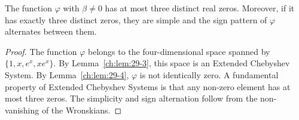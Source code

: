 \begin{lemma}
\label{ch:lem:29-5}
The function \(\varphi\) with \(\beta\neq0\) has at most three distinct real zeros. Moreover, if it has exactly three distinct zeros, they are simple and the sign pattern of \(\varphi\) alternates between them.
\end{lemma}
\begin{proof}
The function \(\varphi\) belongs to the four-dimensional space spanned by \(\{1,x,e^x,xe^x\}\). By Lemma~\ref{ch:lem:29-3}, this space is an Extended Chebyshev System. By Lemma~\ref{ch:lem:29-4}, \(\varphi\) is not identically zero. A fundamental property of Extended Chebyshev Systems is that any non-zero element has at most three zeros. The simplicity and sign alternation follow from the non-vanishing of the Wronskians. 
\end{proof}
